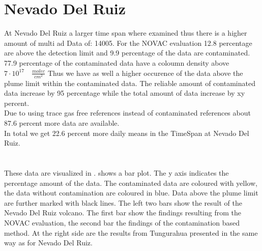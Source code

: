 \documentclass  [
  paper    = a4,
  BCOR     = 10mm,
  twoside,
  fontsize = 12pt,
  fleqn,
  toc      = bibnumbered,
  toc      = listofnumbered,
  numbers  = noendperiod,
  headings = normal,
  listof   = leveldown,
  version  = 3.03
]                                       {scrreprt}
\begin{document}
\section*{Nevado Del Ruiz}
At Nevado Del Ruiz a larger time span where examined thus there is a higher amount of multi ad Data of: 14005.
For the NOVAC evaluation 12.8 percentage are above the detection limit and 9.9 percentage of the data are contaminated.
77.9 percentage of the contaminated data have a   coloumn density above $7\cdot10^{17}\quad \frac{molec}{cm^2}$ Thus we have as well a higher occurence of the data above the plume limit within the contaminated data. 
The reliable amount of contaminated data increase by 95 percentage while the total amount of data increase by xy percent.\\
Due to using trace gas free references instead of contaminated references about 87.6 percent more data are available. \\
In total we get 22.6 percent more daily means in the TimeSpan at Nevado Del Ruiz.\\
\\
\\
These data are visualized in .  shows a bar plot. The y axis indicates the percentage amount of the data.  The contaminated data are coloured with yellow, the data without contamination are coloured in blue. Data above the plume limit are further marked with black lines.  The left two bars show the result of the Nevado Del Ruiz volcano. The first bar show the findings resulting from the NOVAC evaluation, the second bar the findings of the contamination based method. At the right side are the results from Tungurahua presented in the same way as for Nevado Del Ruiz.\\
\\
%
\end{document}
